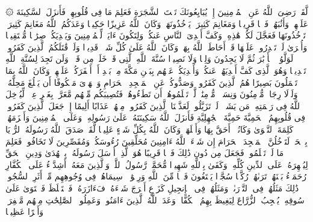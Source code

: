\startbuffer[\q:48:18]
۞ لَّقَدۡ رَضِیَ ٱللَّهُ عَنِ ٱلۡمُؤۡمِنِینَ إِذۡ یُبَایِعُونَكَ تَحۡتَ ٱلشَّجَرَةِ فَعَلِمَ مَا فِی قُلُوبِهِمۡ فَأَنزَلَ ٱلسَّكِینَةَ عَلَیۡهِمۡ وَأَثَٰبَهُمۡ فَتۡحࣰا قَرِیبࣰا%
\stopbuffer
\startbuffer[\q:48:19]
وَمَغَانِمَ كَثِیرَةࣰ یَأۡخُذُونَهَاۗ وَكَانَ ٱللَّهُ عَزِیزًا حَكِیمࣰا%
\stopbuffer
\startbuffer[\q:48:20]
وَعَدَكُمُ ٱللَّهُ مَغَانِمَ كَثِیرَةࣰ تَأۡخُذُونَهَا فَعَجَّلَ لَكُمۡ هَٰذِهِۦ وَكَفَّ أَیۡدِیَ ٱلنَّاسِ عَنكُمۡ وَلِتَكُونَ ءَایَةࣰ لِّلۡمُؤۡمِنِینَ وَیَهۡدِیَكُمۡ صِرَٰطࣰا مُّسۡتَقِیمࣰا%
\stopbuffer
\startbuffer[\q:48:21]
وَأُخۡرَىٰ لَمۡ تَقۡدِرُوا۟ عَلَیۡهَا قَدۡ أَحَاطَ ٱللَّهُ بِهَاۚ وَكَانَ ٱللَّهُ عَلَىٰ كُلِّ شَیۡءࣲ قَدِیرࣰا%
\stopbuffer
\startbuffer[\q:48:22]
وَلَوۡ قَٰتَلَكُمُ ٱلَّذِینَ كَفَرُوا۟ لَوَلَّوُا۟ ٱلۡأَدۡبَٰرَ ثُمَّ لَا یَجِدُونَ وَلِیࣰّا وَلَا نَصِیرࣰا%
\stopbuffer
\startbuffer[\q:48:23]
سُنَّةَ ٱللَّهِ ٱلَّتِی قَدۡ خَلَتۡ مِن قَبۡلُۖ وَلَن تَجِدَ لِسُنَّةِ ٱللَّهِ تَبۡدِیلࣰا%
\stopbuffer
\startbuffer[\q:48:24]
وَهُوَ ٱلَّذِی كَفَّ أَیۡدِیَهُمۡ عَنكُمۡ وَأَیۡدِیَكُمۡ عَنۡهُم بِبَطۡنِ مَكَّةَ مِنۢ بَعۡدِ أَنۡ أَظۡفَرَكُمۡ عَلَیۡهِمۡۚ وَكَانَ ٱللَّهُ بِمَا تَعۡمَلُونَ بَصِیرًا%
\stopbuffer
\startbuffer[\q:48:25]
هُمُ ٱلَّذِینَ كَفَرُوا۟ وَصَدُّوكُمۡ عَنِ ٱلۡمَسۡجِدِ ٱلۡحَرَامِ وَٱلۡهَدۡیَ مَعۡكُوفًا أَن یَبۡلُغَ مَحِلَّهُۥۚ وَلَوۡلَا رِجَالࣱ مُّؤۡمِنُونَ وَنِسَاۤءࣱ مُّؤۡمِنَٰتࣱ لَّمۡ تَعۡلَمُوهُمۡ أَن تَطَءُوهُمۡ فَتُصِیبَكُم مِّنۡهُم مَّعَرَّةُۢ بِغَیۡرِ عِلۡمࣲۖ لِّیُدۡخِلَ ٱللَّهُ فِی رَحۡمَتِهِۦ مَن یَشَاۤءُۚ لَوۡ تَزَیَّلُوا۟ لَعَذَّبۡنَا ٱلَّذِینَ كَفَرُوا۟ مِنۡهُمۡ عَذَابًا أَلِیمًا%
\stopbuffer
\startbuffer[\q:48:26]
إِذۡ جَعَلَ ٱلَّذِینَ كَفَرُوا۟ فِی قُلُوبِهِمُ ٱلۡحَمِیَّةَ حَمِیَّةَ ٱلۡجَٰهِلِیَّةِ فَأَنزَلَ ٱللَّهُ سَكِینَتَهُۥ عَلَىٰ رَسُولِهِۦ وَعَلَى ٱلۡمُؤۡمِنِینَ وَأَلۡزَمَهُمۡ كَلِمَةَ ٱلتَّقۡوَىٰ وَكَانُوۤا۟ أَحَقَّ بِهَا وَأَهۡلَهَاۚ وَكَانَ ٱللَّهُ بِكُلِّ شَیۡءٍ عَلِیمࣰا%
\stopbuffer
\startbuffer[\q:48:27]
لَّقَدۡ صَدَقَ ٱللَّهُ رَسُولَهُ ٱلرُّءۡیَا بِٱلۡحَقِّۖ لَتَدۡخُلُنَّ ٱلۡمَسۡجِدَ ٱلۡحَرَامَ إِن شَاۤءَ ٱللَّهُ ءَامِنِینَ مُحَلِّقِینَ رُءُوسَكُمۡ وَمُقَصِّرِینَ لَا تَخَافُونَۖ فَعَلِمَ مَا لَمۡ تَعۡلَمُوا۟ فَجَعَلَ مِن دُونِ ذَٰلِكَ فَتۡحࣰا قَرِیبًا%
\stopbuffer
\startbuffer[\q:48:28]
هُوَ ٱلَّذِیۤ أَرۡسَلَ رَسُولَهُۥ بِٱلۡهُدَىٰ وَدِینِ ٱلۡحَقِّ لِیُظۡهِرَهُۥ عَلَى ٱلدِّینِ كُلِّهِۦۚ وَكَفَىٰ بِٱللَّهِ شَهِیدࣰا%
\stopbuffer
\startbuffer[\q:48:29]
مُّحَمَّدࣱ رَّسُولُ ٱللَّهِۚ وَٱلَّذِینَ مَعَهُۥۤ أَشِدَّاۤءُ عَلَى ٱلۡكُفَّارِ رُحَمَاۤءُ بَیۡنَهُمۡۖ تَرَىٰهُمۡ رُكَّعࣰا سُجَّدࣰا یَبۡتَغُونَ فَضۡلࣰا مِّنَ ٱللَّهِ وَرِضۡوَٰنࣰاۖ سِیمَاهُمۡ فِی وُجُوهِهِم مِّنۡ أَثَرِ ٱلسُّجُودِۚ ذَٰلِكَ مَثَلُهُمۡ فِی ٱلتَّوۡرَىٰةِۚ وَمَثَلُهُمۡ فِی ٱلۡإِنجِیلِ كَزَرۡعٍ أَخۡرَجَ شَطۡءَهُۥ فَءَازَرَهُۥ فَٱسۡتَغۡلَظَ فَٱسۡتَوَىٰ عَلَىٰ سُوقِهِۦ یُعۡجِبُ ٱلزُّرَّاعَ لِیَغِیظَ بِهِمُ ٱلۡكُفَّارَۗ وَعَدَ ٱللَّهُ ٱلَّذِینَ ءَامَنُوا۟ وَعَمِلُوا۟ ٱلصَّٰلِحَٰتِ مِنۡهُم مَّغۡفِرَةࣰ وَأَجۡرًا عَظِیمَۢا%
